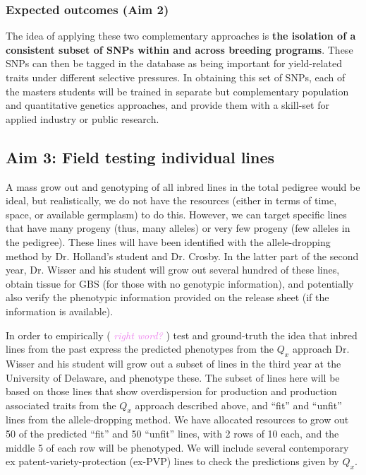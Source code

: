 \documentclass[12pt]{article}
\newcommand{\kc}[1]{\textcolor{violet}{ \emph{\scriptsize  #1}} }
\begin{document}
\subsubsection*{Expected outcomes (Aim 2)}

The idea of applying these two complementary approaches is \textbf{the isolation of a consistent subset of SNPs within and across breeding programs}. 
These SNPs can then be tagged in the database as being important for yield-related traits under different selective pressures.
In obtaining this set of SNPs, each of the masters students will be trained in separate but complementary population and quantitative genetics approaches, and provide them with a skill-set for applied industry or public research. 


\subsection*{Aim 3: Field testing individual lines}
A mass grow out and genotyping of all inbred lines in the total pedigree would be ideal, but realistically, we do not have the resources (either in terms of time, space, or available germplasm) to do this.
However, we can target specific lines that have many progeny (thus, many alleles) or very few progeny (few alleles in the pedigree). These lines will have been identified with the allele-dropping method by Dr. Holland's student and Dr. Crosby. 
In the latter part of the second year, Dr. Wisser and his student will grow out several hundred of these lines, obtain tissue for GBS (for those with no genotypic information), and potentially also verify the phenotypic information provided on the release sheet (if the information is available). 

In order to empirically (\kc{right word?}) test and ground-truth the idea that inbred lines from the past express the predicted phenotypes from the $Q_{x}$ approach Dr. Wisser and his student will grow out a subset of lines in the third year at the University of Delaware, and phenotype these.
The subset of lines here will be based on those lines that show overdispersion for production and production associated traits from the $Q_{x}$ approach described above, and ``fit'' and ``unfit'' lines from the allele-dropping method. 
We have allocated resources to grow out 50 of the predicted ``fit'' and 50 ``unfit'' lines, with 2 rows of 10 each, and the middle 5 of each row will be phenotyped. 
We will include several contemporary ex patent-variety-protection (ex-PVP) lines to check the predictions given by $Q_{x}$.
\end{document}
